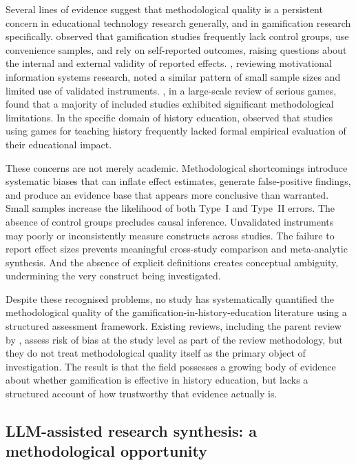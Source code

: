\documentclass[etq]{acnsart}
\begin{document}
	Several lines of evidence suggest that methodological quality is a persistent concern in educational technology research generally, and in gamification research specifically. \citet{DichevDicheva2017} observed that gamification studies frequently lack control groups, use convenience samples, and rely on self-reported outcomes, raising questions about the internal and external validity of reported effects. \citet{KoivistoHamari2019}, reviewing motivational information systems research, noted a similar pattern of small sample sizes and limited use of validated instruments. \citet{Connolly2012}, in a large-scale review of serious games, found that a majority of included studies exhibited significant methodological limitations. In the specific domain of history education, \citet{Oceja2022419} observed that studies using games for teaching history frequently lacked formal empirical evaluation of their educational impact.
	
	These concerns are not merely academic. Methodological shortcomings introduce systematic biases that can inflate effect estimates, generate false-positive findings, and produce an evidence base that appears more conclusive than warranted. Small samples increase the likelihood of both Type~I and Type~II errors. The absence of control groups precludes causal inference. Unvalidated instruments may poorly or inconsistently measure constructs across studies. The failure to report effect sizes prevents meaningful cross-study comparison and meta-analytic synthesis. And the absence of explicit definitions creates conceptual ambiguity, undermining the very construct being investigated.
	
	Despite these recognised problems, no study has systematically quantified the methodological quality of the gamification-in-history-education literature using a structured assessment framework. Existing reviews, including the parent review by \citet{KorniienkoSemerikov2024}, assess risk of bias at the study level as part of the review methodology, but they do not treat methodological quality itself as the primary object of investigation. The result is that the field possesses a growing body of evidence about whether gamification is effective in history education, but lacks a structured account of how trustworthy that evidence actually is.
	
	\subsection{LLM-assisted research synthesis: a methodological opportunity}
	\label{sec:intro_llm}
	
\end{document}
